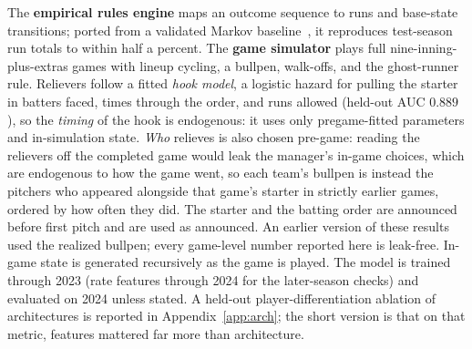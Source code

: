 \documentclass[10pt,twocolumn]{article}
\begin{document}
The \textbf{empirical rules engine} maps an outcome sequence to runs and base-state transitions; ported
from a validated Markov baseline~\cite{bukiet}, it reproduces test-season run totals to within half a
percent. The \textbf{game simulator} plays full nine-inning-plus-extras games with lineup cycling, a
bullpen, walk-offs, and the ghost-runner rule. Relievers follow a fitted \emph{hook model}, a logistic
hazard for pulling the starter in batters faced, times through the order, and runs allowed (held-out
AUC $0.889$), so the \emph{timing} of the hook is endogenous: it uses only pregame-fitted parameters
and in-simulation state. \emph{Who} relieves is also chosen pre-game: reading the relievers off the
completed game would leak the manager's in-game choices, which are endogenous to how the game went, so
each team's bullpen is instead the pitchers who appeared alongside that game's starter in strictly
earlier games, ordered by how often they did. The starter and the batting order are announced before
first pitch and are used as announced. An earlier version of these results used the realized bullpen;
every game-level number reported here is leak-free. In-game state is generated recursively as the game is played. The model is
trained through 2023 (rate features through
2024 for the later-season checks) and evaluated on 2024 unless stated. A held-out player-differentiation
ablation of architectures is reported in Appendix~\ref{app:arch}; the short version is that on that
metric, features mattered far more than architecture.
\end{document}
